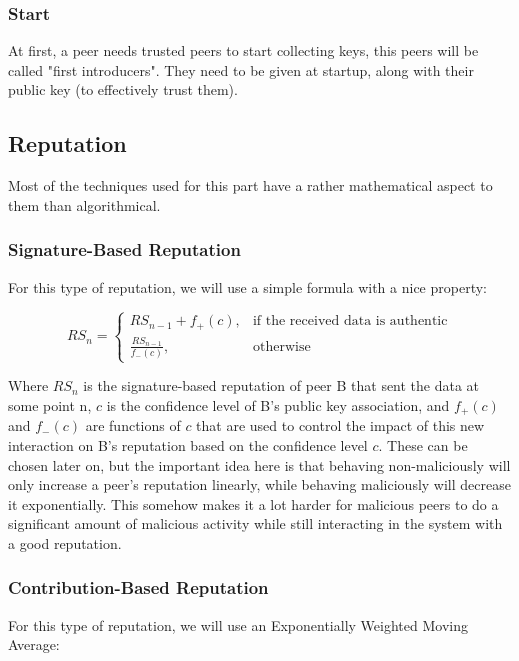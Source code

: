 \documentclass[]{article}
\begin{document}
\subsubsection{Start}
At first, a peer needs trusted peers to start collecting keys, this peers will be called "first introducers". They need to be given at startup, along with their public key (to effectively trust them).

\subsection{Reputation}
\label{sec:rep-spec}
Most of the techniques used for this part have a rather mathematical aspect to them than algorithmical.

\subsubsection{Signature-Based Reputation}
For this type of reputation, we will use a simple formula with a nice property:

\begin{equation}
    \label{eq:sig-rep}
    RS_n = 
    \begin{cases}
        RS_{n-1} + f_+(c),       & \text{if the received data is authentic}
        \\
        \frac{RS_{n-1}}{f_-(c)}, & \text{otherwise}
    \end{cases}
\end{equation}

\noindent
Where $RS_n$ is the signature-based reputation of peer B that sent the data at some point n, $c$ is the confidence level of B's public key association, and $f_+(c)$ and $f_-(c)$ are functions of $c$ that are used to control the impact of this new interaction on B's reputation based on the confidence level $c$.
These can be chosen later on, but the important idea here is that behaving non-maliciously will only increase a peer's reputation linearly, while behaving maliciously will decrease it exponentially.
This somehow makes it a lot harder for malicious peers to do a significant amount of malicious activity while still interacting in the system with a good reputation.

\subsubsection{Contribution-Based Reputation}
For this type of reputation, we will use an Exponentially Weighted Moving Average:
\end{document}
